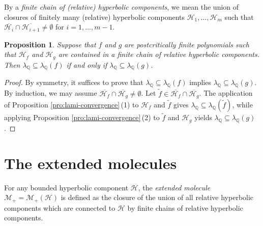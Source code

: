\documentclass[a4paper,reqno,times, 11pt]{amsart}
\newtheorem{proposition}[theorem]{Proposition}
\theoremstyle{remark}
\theoremstyle{plain}
\numberwithin{equation}{section}
\def\MMMM{{\cal M}}
\def\MMMM{\mathscr M}
\def\HHHH{\mathscr H}
\def\t{\tilde}
\def\Q{\mathbb Q}
\def\cal{\mathcal}
\begin{document}
	By a \emph{finite chain of (relative) hyperbolic components}, we mean the union of closures of finitely many (relative) hyperbolic components $\HHHH_1,\ldots,\HHHH_m$ such that $\overline{\HHHH_i}\cap \overline{\HHHH_{i+1}}\not=\emptyset$ for $i=1,\ldots,m-1$.
	
	\begin{proposition}\label{pro:transitive1}
		Suppose that $f$ and $g$ are postcritically finite polynomials such that $\HHHH_f$ and $\HHHH_g$ are contained in a finite chain of relative hyperbolic components. Then $\lambda_\Q\subseteq \lambda_\Q(f)$ if and only if $\lambda_\Q\subseteq \lambda_\Q(g)$.
	\end{proposition}
	\begin{proof}
		By symmetry, it suffices to prove that $\lambda_\mathbb{Q} \subseteq \lambda_\mathbb{Q}(f)$ implies $\lambda_\mathbb{Q} \subseteq \lambda_\mathbb{Q}(g)$.
		By induction, we may assume $\overline{\HHHH_f} \cap \overline{\HHHH_g} \neq \emptyset$.
		Let $\t{f}\in \overline{\HHHH_f}\cap\overline{\HHHH_g}$. The application of Proposition \ref{pro:lami-convergence}\,(1) to $\HHHH_f$ and $\t{f}$ gives $\lambda_\Q\subseteq \lambda_\Q(\t{f})$, while applying Proposition \ref{pro:lami-convergence}\,(2) to $\t{f}$ and $\HHHH_g$ yields $\lambda_\Q\subseteq \lambda_\Q(g)$.
	\end{proof}
	
	\section{The extended molecules}\label{sec:B}
	
	
	
	For any bounded hyperbolic component $\HHHH$, the \emph{extended molecule} $\MMMM_+=\MMMM_+(\HHHH)$  is defined as the closure of the union of all relative hyperbolic components which are connected to $\HHHH$ by finite chains of relative hyperbolic components.
	
	
	
	
	
	
	
\end{document}
